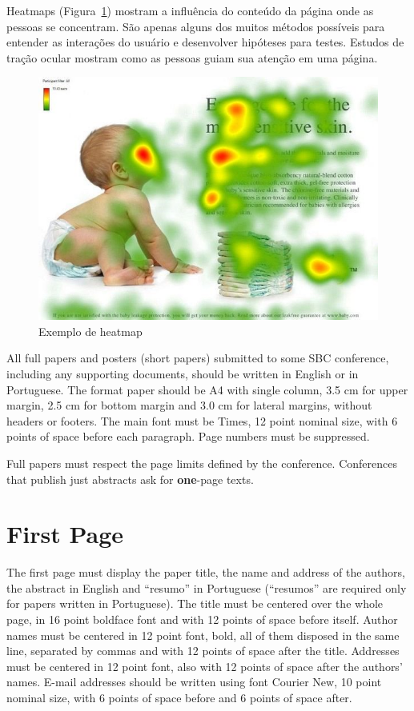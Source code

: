 \documentclass[12pt]{article}
\begin{document}
Heatmaps (Figura~\ref{fig:heatmap1}) mostram a influência do conteúdo da página onde as pessoas se concentram. São apenas alguns dos muitos métodos possíveis para entender as interações do usuário e desenvolver hipóteses para testes. Estudos de tração ocular mostram como as pessoas guiam sua atenção em uma página.
\cite{goward:13}

\begin{figure}[ht]
\centering
\includegraphics[width=.3\textwidth]{fig1.jpg}
\caption{Exemplo de heatmap}
\label{fig:heatmap1}
\end{figure}

All full papers and posters (short papers) submitted to some SBC conference,
including any supporting documents, should be written in English or in
Portuguese. The format paper should be A4 with single column, 3.5 cm for upper
margin, 2.5 cm for bottom margin and 3.0 cm for lateral margins, without
headers or footers. The main font must be Times, 12 point nominal size, with 6
points of space before each paragraph. Page numbers must be suppressed.

Full papers must respect the page limits defined by the conference.
Conferences that publish just abstracts ask for \textbf{one}-page texts.

\section{First Page} \label{sec:firstpage}

The first page must display the paper title, the name and address of the
authors, the abstract in English and ``resumo'' in Portuguese (``resumos'' are
required only for papers written in Portuguese). The title must be centered
over the whole page, in 16 point boldface font and with 12 points of space
before itself. Author names must be centered in 12 point font, bold, all of
them disposed in the same line, separated by commas and with 12 points of
space after the title. Addresses must be centered in 12 point font, also with
12 points of space after the authors' names. E-mail addresses should be
written using font Courier New, 10 point nominal size, with 6 points of space
before and 6 points of space after.
\end{document}
